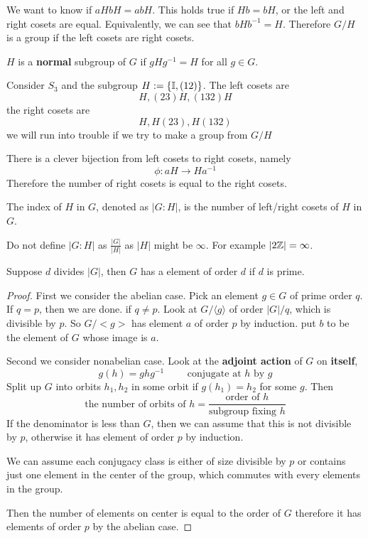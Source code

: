\begin{answer}
	We want to know if $aHbH = abH$. This holds true if $Hb = bH$, or the left and right cosets are equal. Equivalently, we can see that $bHb^{-1} = H$. Therefore $G/H$ is a group if the left cosets are right cosets.
\end{answer}
\begin{definition}
	$H$ is a \textbf{normal} subgroup of $G$ if $gHg^{-1} = H$ for all $g \in G$.
\end{definition}
\begin{example}
	Consider $S_3$ and the subgroup $H := \left\{ \mathbb I, (12) \right\}$. The left cosets are
	\[ H, (23)H, (132)H \]
	the right cosets are
	\[ H, H(23), H(132)\]
	we will run into trouble if we try to make a group from $G/H$
\end{example}
\begin{remark}
	There is a clever bijection from left cosets to right cosets, namely
	\[ \phi : aH \to Ha^{-1} \]
	Therefore the number of right cosets is equal to the right cosets.
\end{remark}
\begin{definition}
	The index of $H$ in $G$, denoted as $|G:H|$, is the number of left/right cosets of $H$ in $G$.
\end{definition}
\begin{remark}
	Do not define $|G:H|$ as $\frac{|G|}{|H|}$ as $|H|$ might be $\infty$. For example $|2 \mathbb Z| = \infty$.
\end{remark}
\begin{theorem}
	Suppose $d$ divides $|G|$, then $G$ has a element of order $d$ if $d$ is prime.
\end{theorem}
\begin{proof}
	First we consider the abelian case. Pick an element $g \in G$ of prime order $q$. If $q = p$, then we are done. if $q \neq p$. Look at $G/\langle g \rangle$ of order $|G|/q$, which is divisible by $p$. So $G/<g>$ has element $a$ of order $p$ by induction. put $b$ to be the element of $G$ whose image is $a$. 

	Second we consider nonabelian case. Look at the \textbf{adjoint action} of $G$ on \textbf{itself}, 
	\[ g(h) = ghg^{-1} \qquad \text{ conjugate at $h$ by $g$} \]
	Split up $G$ into orbits $h_1, h_2$ in some orbit if $g(h_1)= h_2$ for some $g$. Then \[\text{the number of orbits of } h = \frac{\text{order of $h$}}{\text{subgroup fixing $h$}}\] If the denominator is less than $G$, then we can assume that this is not divisible by $p$, otherwise it has element of order $p$ by induction. 

	We can assume each conjugacy class is either of size divisible by $p$ or contains just one element in the center of the group, which commutes with every elements in the group. 

	Then the number of elements on center is equal to the order of $G$ therefore it has elements of order $p$ by the abelian case.

\end{proof}

